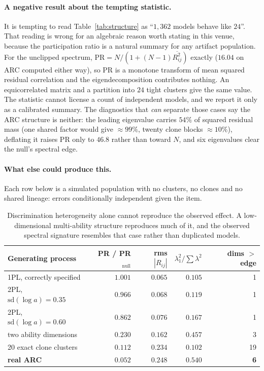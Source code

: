 \documentclass{article}
\begin{document}
\paragraph{A negative result about the tempting statistic.} It is tempting to read
Table~\ref{tab:structure} as ``$1{,}362$ models behave like $24$''. That reading is wrong for an
algebraic reason worth stating in this venue, because the participation ratio is a natural summary
for any artifact population. For the unclipped spectrum,
$\mathrm{PR}=N/(1+(N-1)\overline{R_{ij}^2})$ exactly ($16.04$ on ARC computed either way), so
PR is a monotone transform of mean squared residual correlation and the eigendecomposition
contributes nothing. An equicorrelated matrix and a partition into $24$ tight clusters give the same
value. The statistic cannot license a count of independent models, and we report it only as a
calibrated summary. The diagnostics that \emph{can} separate those cases say the ARC structure is
neither: the leading eigenvalue carries $54\%$ of squared residual mass (one shared factor would
give $\approx99\%$, twenty clone blocks $\approx10\%$), deflating it raises PR only to $46.8$
rather than toward $N$, and six eigenvalues clear the null's spectral edge.

\paragraph{What else could produce this.} Each row below is a simulated population with no clusters,
no clones and no shared lineage: errors conditionally independent given the item.

\begin{table}[t]\centering\small
\begin{tabular}{lrrrr}
\toprule
Generating process & PR / PR$_{\text{null}}$ & rms $|R_{ij}|$ & $\lambda_1^2/\sum\lambda^2$ & dims $>$ edge \\
\midrule
1PL, correctly specified & $1.001$ & $0.065$ & $0.105$ & 1 \\
2PL, $\mathrm{sd}(\log a)=0.35$ & $0.966$ & $0.068$ & $0.119$ & 1 \\
2PL, $\mathrm{sd}(\log a)=0.60$ & $0.862$ & $0.076$ & $0.167$ & 1 \\
two ability dimensions & $0.230$ & $0.162$ & $0.457$ & 3 \\
20 exact clone clusters & $0.112$ & $0.234$ & $0.102$ & 19 \\
\midrule
\textbf{real ARC} & $\mathbf{0.052}$ & $\mathbf{0.248}$ & $\mathbf{0.540}$ & \textbf{6} \\
\bottomrule
\end{tabular}
\caption{Discrimination heterogeneity alone cannot reproduce the observed effect. A low-dimensional
multi-ability structure reproduces much of it, and the observed spectral signature resembles that
case rather than duplicated models.}
\label{tab:misspec}
\end{table}
\end{document}

